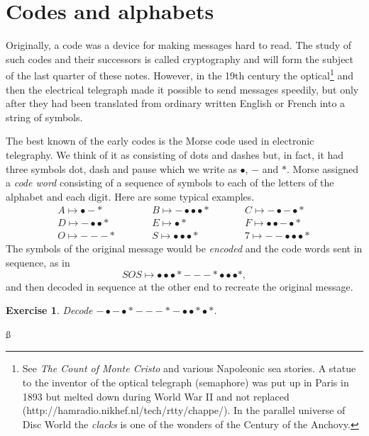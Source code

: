 \documentclass[12pt,a4paper]{article}
\theoremstyle{plain}
\newtheorem{exercise}[theorem]{Exercise}
\theoremstyle{definition}
\begin{document}
\section{Codes and alphabets}\label{S;alphabets}
Originally, a code was a device for making messages
hard to read. The study of such codes and their
successors is called cryptography and will form
the subject of the last quarter of these notes.
However, in the 19th century the
optical\footnote{See \emph{The Count of Monte Cristo}
and various Napoleonic sea stories.
A statue to the inventor of the optical telegraph
(semaphore)
was put up in Paris in 1893 but melted down during
World War II and not replaced 
(http://hamradio.nikhef.nl/tech/rtty/chappe/).
In the parallel universe of Disc World the 
\emph{clacks} is one of the wonders of the
Century of the Anchovy.} and
then the electrical telegraph made it
possible to send messages speedily, but
only after they had been translated from ordinary written
English or French into a string of symbols.

The best known of the early codes is the Morse code
used in electronic telegraphy.
We think of it as consisting of dots and 
dashes but, in fact, it had three symbols dot, dash and pause
which we write as $\bullet$, $-$ and $*$.
Morse assigned a \emph{code word} consisting of a 
sequence of symbols to each of the letters of the alphabet
and each digit. Here are some typical examples.
\begin{align*}
A\mapsto \bullet-*\qquad
&&B\mapsto -\bullet\bullet\bullet*\qquad
&&C\mapsto-\bullet-\bullet*\\
D\mapsto -\bullet\bullet*\qquad
&&E\mapsto \bullet*\qquad
&&F\mapsto\bullet\bullet-\bullet*\\
O\mapsto ---*\qquad
&&S\mapsto\bullet\bullet\bullet*\qquad
&&7\mapsto--\bullet\bullet\bullet*
\end{align*}
The symbols of the original message would be \emph{encoded}
and the code words sent in sequence, as in
\[SOS\mapsto
\bullet\bullet\bullet*---*\bullet\bullet\bullet*,\]
and then decoded in sequence at the other end
to recreate the original message.
\begin{exercise}\label{E;Morse}
Decode
$-\bullet-\bullet*---*-\bullet\bullet* \bullet*$.
\end{exercise}
{\ss}
\end{document}

